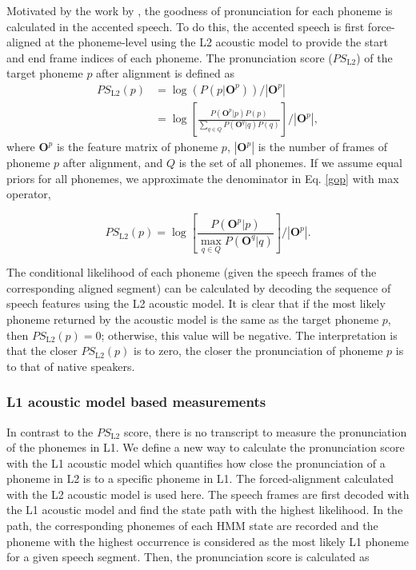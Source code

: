 Motivated by the work by \cite{witt2000phone}, the goodness of pronunciation for each phoneme is calculated in the accented speech. To do this, the accented speech is first force-aligned at the phoneme-level using the L2 acoustic model to provide the start and end frame indices of each phoneme. The pronunciation score ($PS_{\mathrm{L2}}$) of the target phoneme $p$ after alignment is defined as
\begin{equation}
\label{gop}
\begin{aligned}
PS_{\mathrm{L2}}(p) &= \log(P(p|\mathbf{O}^{p}))/\left | \mathbf{O}^{p} \right | \\
      &= \log \left [ \frac{P(\mathbf{O}^{p}|p)P(p)}{\sum_{q\in \mathit{Q}} P(\mathbf{O}^{q}|q)P(q)} \right ] /\left | \mathbf{O}^{p} \right |,
\end{aligned}
\end{equation}
where $\mathbf{O}^{p}$ is the feature matrix of phoneme $p$, $\left |\mathbf{O}^{p}\right |$ is the number of frames of phoneme $p$ after alignment, and $\mathit{Q}$ is the set of all phonemes. If we assume equal priors for all phonemes, we approximate the denominator in Eq. \ref{gop} with max operator,

\begin{equation}
\label{gop2}
PS_{\mathrm{L2}}(p) = \log \left [ \frac{P(\mathbf{O}^{p}|p)}{\max_{q\in \mathit{Q}} P(\mathbf{O}^{q}|q)} \right ] /\left | \mathbf{O}^{p} \right |.
\end{equation}

The conditional likelihood of each phoneme (given the speech frames of the corresponding aligned segment) can be calculated by decoding the sequence of speech features using the L2 acoustic model. It is clear that if the most likely phoneme returned by the acoustic model is the same as the target phoneme $p$, then $PS_{\mathrm{L2}}(p)=0$; otherwise, this value will be negative. The interpretation is that the closer $PS_{\mathrm{L2}}(p)$ is to zero, the closer the pronunciation of phoneme $p$ is to that of native speakers.

\subsubsection{L1 acoustic model based measurements}
\label{sec:L1_measure}

In contrast to the $PS_{\mathrm{L2}}$ score, there is no transcript to measure the pronunciation of the phonemes in L1. We define a new way to calculate the pronunciation score with the L1 acoustic model which quantifies how close the pronunciation of a phoneme in L2 is to a specific phoneme in L1. The forced-alignment calculated with the L2 acoustic model is used here. The speech frames are first decoded with the L1 acoustic model and find the state path with the highest likelihood. In the path, the corresponding phonemes of each HMM state are recorded and the phoneme with the highest occurrence is considered as the most likely L1 phoneme for a given speech segment. Then, the pronunciation score is calculated as

